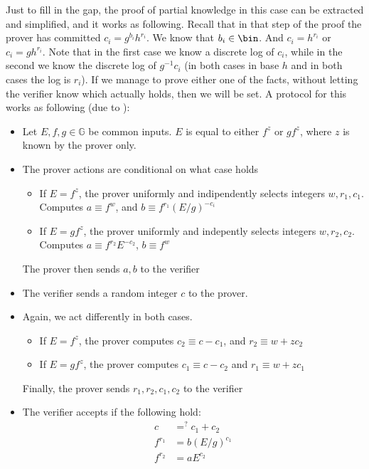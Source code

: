 \documentclass{article}
\begin{document}
Just to fill in the gap, the proof of partial knowledge in this case can be extracted and simplified, and it works as following. 
Recall that in that step of the proof the prover has committed $c_i = g^{b_i} h^{r_i}$. We know that $b_i \in \bin$. And $c_i = h^{r_i}$ or $c_i = g h^{r_i}$.
Note that in the first case we know a discrete log of $c_i$, while in the second we know the discrete log of $g^{-1} c_i$ (in both cases in base $h$ and in both cases the log is $r_i$). 
If we manage to prove either one of the facts, without letting the verifier know which actually holds, then we will be set. 
A protocol for this works as following (due to \cite{maoGuaranteedCorrectSharing1998b}):
\begin{itemize}
    \item Let $E, f, g \in \mathbb{G}$ be common inputs. $E$ is equal to either $f^z$ or $g f^z$, where $z$ is known by the prover only.
    \item The prover actions are conditional on what case holds
    \begin{itemize}
        \item If $E = f^z$, the prover uniformly and indipendently selects integers $w, r_1, c_1$. Computes $a \equiv f^w$, and $b \equiv f^{r_1}(E/g)^{-c_i}$
        \item If $E = g f^z$, the prover uniformly and indepently selects integers $w, r_2, c_2$. Computes $a \equiv f^{r_2} E^{-c_2}$, $b \equiv f^w$
    \end{itemize}
    The prover then sends $a, b$ to the verifier
    \item The verifier sends a random integer $c$ to the prover.
    \item Again, we act differently in both cases.
    \begin{itemize}
        \item If $E = f^z$, the prover computes $c_2 \equiv c - c_1$, and $r_2 \equiv w + z c_2$
        \item If $E = g f^z$, the prover computes $c_1 \equiv c - c_2$ and $r_1 \equiv w + z c_1$ 
    \end{itemize}
    Finally, the prover sends $r_1, r_2, c_1, c_2$ to the verifier
    \item The verifier accepts if the following hold:
    \begin{align*}
        c &=^? c_1 + c_2 \\
        f^{r_1} &= b(E/g)^{c_1} \\
        f^{r_2} &= a E^{c_2}
    \end{align*}
\end{itemize}
\end{document}
